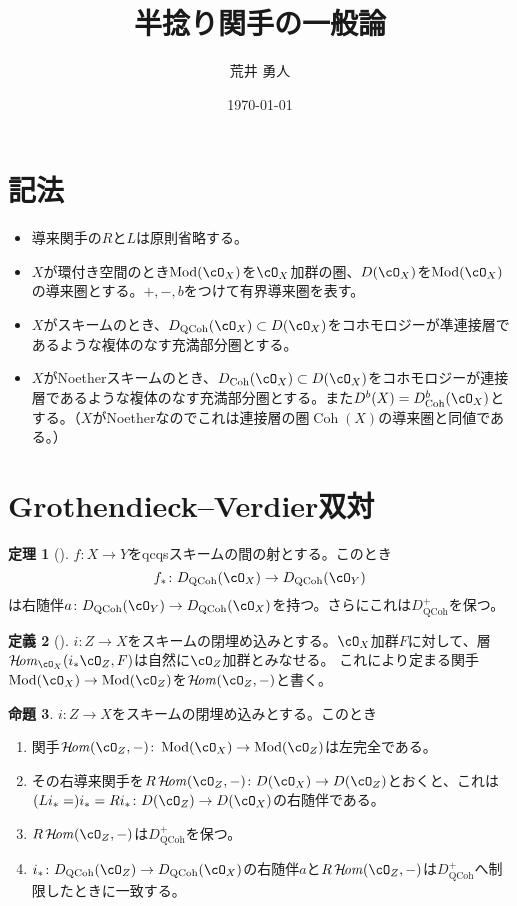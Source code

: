 \documentclass[uplatex, a4paper, dvipdfmx]{jsarticle}
\title{半捻り関手の一般論}
\author{荒井 勇人}
\date{\today}
\theoremstyle{definition}
\newtheorem{theorem}{定理}[section]
\newtheorem{definition}[theorem]{定義}
\newtheorem{proposition}[theorem]{命題}
\DeclareMathOperator{\CHom}{\mathcal{H}\!\mathit{om}}
\DeclareMathOperator{\Coh}{\mathrm{Coh}}
\DeclareMathOperator{\QCoh}{\mathrm{QCoh}}
\DeclareMathOperator{\Mod}{\mathrm{Mod}}
\begin{document}
\maketitle
\section{記法}
\begin{itemize}
    \item 導来関手の$R$と$L$は原則省略する。
    \item $X$が環付き空間のとき$\Mod(\cO_X)$を$\cO_X$加群の圏、$D(\cO_X)$を$\Mod(\cO_X)$の導来圏とする。$+, -, b$をつけて有界導来圏を表す。
    \item $X$がスキームのとき、$D_{\QCoh}(\cO_X) \subset D(\cO_X)$をコホモロジーが凖連接層であるような複体のなす充満部分圏とする。
    \item $X$がNoetherスキームのとき、$D_{\Coh}(\cO_X) \subset D(\cO_X)$をコホモロジーが連接層であるような複体のなす充満部分圏とする。また$D^b(X) = D_{\Coh}^b(\cO_X)$とする。（$X$がNoetherなのでこれは連接層の圏$\Coh(X)$の導来圏と同値である。）
\end{itemize}
\section{Grothendieck--Verdier双対}
\begin{theorem}[{\cite[\href{https://stacks.math.columbia.edu/tag/0A9E}{Tag 0A9E}]{stacks-project}}]
    $f \colon X \to Y$をqcqsスキームの間の射とする。このとき
    \begin{equation}
        f_* \colon D_{\QCoh}(\cO_X) \to D_{\QCoh}(\cO_Y)
    \end{equation}
    は右随伴$a \colon D_{\QCoh}(\cO_Y) \to D_{\QCoh}(\cO_X)$を持つ。さらにこれは$D_{\QCoh}^+$を保つ。
\end{theorem}
\begin{definition}[{\cite[\href{https://stacks.math.columbia.edu/tag/0A74}{Tag 0A74}]{stacks-project}}]
    $i \colon Z \to X$をスキームの閉埋め込みとする。$\cO_X$加群$F$に対して、層$\CHom_{\cO_X}(i_*\cO_Z, F)$は自然に$\cO_Z$加群とみなせる。
    これにより定まる関手$\Mod(\cO_X) \to \Mod(\cO_Z)$を$\CHom(\cO_Z, -)$と書く。
\end{definition}
\begin{proposition}
    $i \colon Z \to X$をスキームの閉埋め込みとする。このとき
    \begin{enumerate}
        \item 関手$\CHom(\cO_Z, -) \colon \Mod(\cO_X) \to \Mod(\cO_Z)$は左完全である。
        \item その右導来関手を$R\CHom(\cO_Z, -) \colon D(\cO_X) \to D(\cO_Z)$とおくと、これは$(L i_* = )i_* = R i_* \colon D(\cO_Z) \to D(\cO_X)$の右随伴である。
        \item $R\CHom(\cO_Z, -)$は$D_{\QCoh}^+$を保つ。
        \item $i_* \colon D_{\QCoh}(\cO_Z) \to D_{\QCoh}(\cO_X)$の右随伴$a$と$R\CHom(\cO_Z, -)$は$D_{\QCoh}^+$へ制限したときに一致する。
    \end{enumerate}
\end{proposition}
\end{document}
